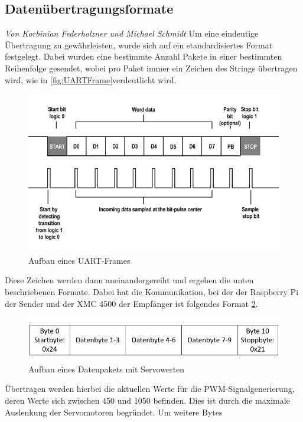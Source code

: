 \documentclass[12pt,a4paper,bibliography=totoc,listof=totoc]{scrartcl}
\begin{document}
\subsection{Datenübertragungsformate}
\textit{Von Korbinian Federholzner und Michael Schmidt}\newline
Um eine eindeutige Übertragung zu gewährleisten, wurde sich auf ein standardisiertes Format festgelegt. 
Dabei wurden eine bestimmte Anzahl Pakete in einer bestimmten Reihenfolge gesendet, wobei pro Paket immer 
ein Zeichen des Strings übertragen wird, wie in \ref{fig:UARTFrame}verdeutlicht wird.
\begin{figure}[htbp]
	\centering
	\includegraphics[scale = 0.44]{pics/Uartframe}
	\caption{Aufbau eines UART-Frames\cite {electricimp}}
	\label{UARTFrame}
\end{figure}
Diese Zeichen werden dann aneinandergereiht und ergeben die unten beschriebenen Formate. Dabei hat die 
Kommunikation, bei der der Raspberry Pi der Sender und der XMC 4500 der Empfänger ist folgendes Format 
\ref{UART Servo}.
\begin{figure}[htbp]
	\centering
	\includegraphics[scale = 0.44]{pics/Uartservo}
	\caption{Aufbau eines Datenpakets mit Servowerten}
	\label{UART Servo}
\end{figure}
Übertragen werden hierbei die aktuellen Werte für die PWM-Signalgenerierung, deren Werte sich zwischen 
450 und 1050 befinden. Dies ist durch die maximale Auslenkung der Servomotoren begründet. Um weitere Bytes 
\end{document}
